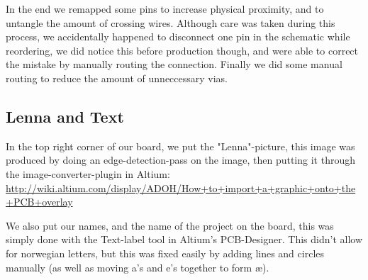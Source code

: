 In the end we remapped some pins to increase physical proximity, and to untangle the
amount of crossing wires. Although care was taken during this process, we accidentally
happened to disconnect one pin in the schematic while reordering, we did notice this before
production though, and were able to correct the mistake by manually routing the connection.
Finally we did some manual routing to reduce the amount of unneccessary vias. \\

\subsection {Lenna and Text}
In the top right corner of our board, we put the "Lenna"-picture, this image
was produced by doing an edge-detection-pass on the image, then putting it through
the image-converter-plugin in Altium: \url{http://wiki.altium.com/display/ADOH/How+to+import+a+graphic+onto+the+PCB+overlay}

We also put our names, and the name of the project on the board, this was simply done
with the Text-label tool in Altium's PCB-Designer. This didn't allow for norwegian letters,
but this was fixed easily by adding lines and circles manually (as well as moving a's and e's together
to form æ).
